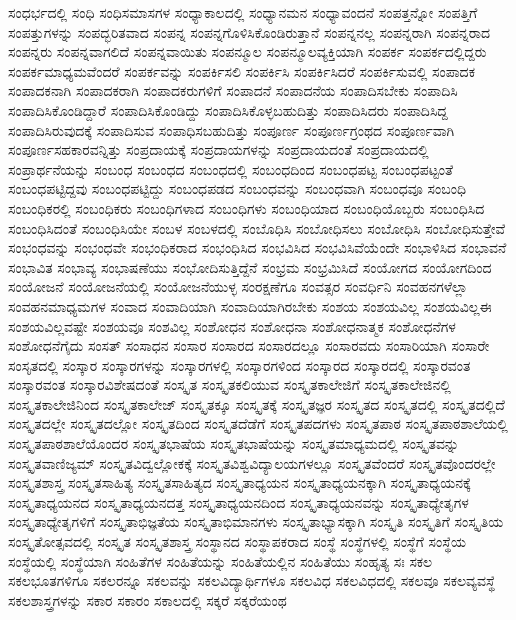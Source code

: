 {ಸಂಧರ್ಭದಲ್ಲಿ
ಸಂಧಿ
ಸಂಧಿಸಮಾಸಗಳ
ಸಂಧ್ಯಾಕಾಲದಲ್ಲಿ
ಸಂಧ್ಯಾನಮನ
ಸಂಧ್ಯಾವಂದನೆ
ಸಂಪತ್ತನ್ನೋ
ಸಂಪತ್ತಿಗೆ
ಸಂಪತ್ತುಗಳನ್ನು
ಸಂಪದ್ಭರಿತವಾದ
ಸಂಪನ್ನ
ಸಂಪನ್ನಗೊಳಿಸಿಕೊಂಡಿರುತ್ತಾನೆ
ಸಂಪನ್ನನಲ್ಲ
ಸಂಪನ್ನರಾಗಿ
ಸಂಪನ್ನರಾದ
ಸಂಪನ್ನರು
ಸಂಪನ್ನವಾಗಲಿದೆ
ಸಂಪನ್ನವಾಯಿತು
ಸಂಪನ್ಮೂಲ
ಸಂಪನ್ಮೂಲವ್ಯಕ್ತಿಯಾಗಿ
ಸಂಪರ್ಕ
ಸಂಪರ್ಕದಲ್ಲಿದ್ದರು
ಸಂಪರ್ಕಮಾಧ್ಯಮವೆಂದರೆ
ಸಂಪರ್ಕವನ್ನು
ಸಂಪರ್ಕಿಸಲಿ
ಸಂಪರ್ಕಿಸಿ
ಸಂಪರ್ಕಿಸಿದರೆ
ಸಂಪರ್ಕಿಸುವಲ್ಲಿ
ಸಂಪಾದಕ
ಸಂಪಾದಕನಾಗಿ
ಸಂಪಾದಕರಾಗಿ
ಸಂಪಾದಕರುಗಳಿಗೆ
ಸಂಪಾದನೆ
ಸಂಪಾದನೆಯ
ಸಂಪಾದಿಸಬೇಕು
ಸಂಪಾದಿಸಿ
ಸಂಪಾದಿಸಿಕೊಂಡಿದ್ದಾರೆ
ಸಂಪಾದಿಸಿಕೊಂಡಿದ್ದು
ಸಂಪಾದಿಸಿಕೊಳ್ಳಬಹುದಿತ್ತು
ಸಂಪಾದಿಸಿದರು
ಸಂಪಾದಿಸಿದ್ದ
ಸಂಪಾದಿಸಿರುವುದಕ್ಕೆ
ಸಂಪಾದಿಸುವ
ಸಂಪಾಧಿಸಬಹುದಿತ್ತು
ಸಂಪೂರ್ಣ
ಸಂಪೂರ್ಣಗ್ರಂಥದ
ಸಂಪೂರ್ಣವಾಗಿ
ಸಂಪೂರ್ಣಸಹಕಾರವನ್ನಿತ್ತು
ಸಂಪ್ರದಾಯಕ್ಕೆ
ಸಂಪ್ರದಾಯಗಳನ್ನು
ಸಂಪ್ರದಾಯದಂತೆ
ಸಂಪ್ರದಾಯದಲ್ಲಿ
ಸಂಪ್ರಾರ್ಥನೆಯನ್ನು
ಸಂಬಂಧ
ಸಂಬಂಧದ
ಸಂಬಂಧದಲ್ಲಿ
ಸಂಬಂಧದಿಂದ
ಸಂಬಂಧಪಟ್ಟ
ಸಂಬಂಧಪಟ್ಟಂತೆ
ಸಂಬಂಧಪಟ್ಟಿದ್ದವು
ಸಂಬಂಧಪಟ್ಟಿದ್ದು
ಸಂಬಂಧಪಡದ
ಸಂಬಂಧವನ್ನು
ಸಂಬಂಧವಾಗಿ
ಸಂಬಂಧವೂ
ಸಂಬಂಧಿ
ಸಂಬಂಧಿಕರಲ್ಲಿ
ಸಂಬಂಧಿಕರು
ಸಂಬಂಧಿಗಳಾದ
ಸಂಬಂಧಿಗಳು
ಸಂಬಂಧಿಯಾದ
ಸಂಬಂಧಿಯೊಬ್ಬರು
ಸಂಬಂಧಿಸಿದ
ಸಂಬಂಧಿಸಿದಂತೆ
ಸಂಬಂಧಿಸಿಯೇ
ಸಂಬಳ
ಸಂಬಳದಲ್ಲಿ
ಸಂಬೊಧಿಸಿ
ಸಂಬೋಧಿಸಲು
ಸಂಬೋಧಿಸಿ
ಸಂಬೋಧಿಸುತ್ತೇವೆ
ಸಂಭಂಧವನ್ನು
ಸಂಭಂಧವೇ
ಸಂಭಂಧಿಕರಾದ
ಸಂಭಂಧಿಸಿದ
ಸಂಭವಿಸಿದ
ಸಂಭವಿಸಿವೆಯೆಂದೇ
ಸಂಭಾಳಿಸಿದ
ಸಂಭಾವನೆ
ಸಂಭಾವಿತ
ಸಂಭಾವ್ಯ
ಸಂಭಾಷಣೆಯು
ಸಂಭೋದಿಸುತ್ತಿದ್ದೆನೆ
ಸಂಭ್ರಮ
ಸಂಭ್ರಮಿಸಿದೆ
ಸಂಯೋಗದ
ಸಂಯೋಗದಿಂದ
ಸಂಯೋಜನೆ
ಸಂಯೋಜನೆಯಲ್ಲಿ
ಸಂಯೋಜನೆಯುಳ್ಳ
ಸಂರಕ್ಷಣೆಗೂ
ಸಂವತ್ಸರ
ಸಂವರ್ಧಿನಿ
ಸಂವಹನಗಳೆಲ್ಲಾ
ಸಂವಹನಮಾಧ್ಯಮಗಳ
ಸಂವಾದ
ಸಂವಾದಿಯಾಗಿ
ಸಂವಾದಿಯಾಗಿರಬೇಕು
ಸಂಶಯ
ಸಂಶಯವಿಲ್ಲ
ಸಂಶಯವಿಲ್ಲಈ
ಸಂಶಯವಿಲ್ಲವಷ್ಟೇ
ಸಂಶಯವೂ
ಸಂಶವಿಲ್ಲ
ಸಂಶೋಧನ
ಸಂಶೋಧನಾ
ಸಂಶೋಧನಾತ್ಮಕ
ಸಂಶೋಧನೆಗಳ
ಸಂಶೋಧನೆಗೈದು
ಸಂಸತ್
ಸಂಸಾಧನ
ಸಂಸಾರ
ಸಂಸಾರದ
ಸಂಸಾರದಲ್ಲೂ
ಸಂಸಾರವದು
ಸಂಸಾರಿಯಾಗಿ
ಸಂಸಾರೇ
ಸಂಸೃತದಲ್ಲಿ
ಸಂಸ್ಕಾರ
ಸಂಸ್ಕಾರಗಳನ್ನು
ಸಂಸ್ಕಾರಗಳಲ್ಲಿ
ಸಂಸ್ಕಾರಗಳಿಂದ
ಸಂಸ್ಕಾರದ
ಸಂಸ್ಕಾರದಲ್ಲಿ
ಸಂಸ್ಕಾರವಂತ
ಸಂಸ್ಕಾರವಂತ
ಸಂಸ್ಕಾರವಿಶೇಷದಂತೆ
ಸಂಸ್ಕೃತ
ಸಂಸ್ಕೃತಕಲಿಯುವ
ಸಂಸ್ಕೃತಕಾಲೇಜಿಗೆ
ಸಂಸ್ಕೃತಕಾಲೇಜಿನಲ್ಲಿ
ಸಂಸ್ಕೃತಕಾಲೇಜಿನಿಂದ
ಸಂಸ್ಕೃತಕಾಲೇಜ್
ಸಂಸ್ಕೃತಕ್ಕೂ
ಸಂಸ್ಕೃತಕ್ಕೆ
ಸಂಸ್ಕೃತಜ್ಞರ
ಸಂಸ್ಕೃತದ
ಸಂಸ್ಕೃತದಲ್ಲಿ
ಸಂಸ್ಕೃತದಲ್ಲಿದೆ
ಸಂಸ್ಕೃತದಲ್ಲೇ
ಸಂಸ್ಕೃತದಲ್ಲೋ
ಸಂಸ್ಕೃತದಿಂದ
ಸಂಸ್ಕೃತದೆಡೆಗೆ
ಸಂಸ್ಕೃತಪದಗಳು
ಸಂಸ್ಕೃತಪಾಠ
ಸಂಸ್ಕೃತಪಾಠಶಾಲೆಯಲ್ಲಿ
ಸಂಸ್ಕೃತಪಾಠಶಾಲೆಯೊಂದರ
ಸಂಸ್ಕೃತಭಾಷೆಯ
ಸಂಸ್ಕೃತಭಾಷೆಯನ್ನು
ಸಂಸ್ಕೃತಮಾಧ್ಯಮದಲ್ಲಿ
ಸಂಸ್ಕೃತವನ್ನು
ಸಂಸ್ಕೃತವಾಣಿಜ್ಯಮ್
ಸಂಸ್ಕೃತವಿದ್ವಲ್ಲೋಕಕ್ಕೆ
ಸಂಸ್ಕೃತವಿಶ್ವವಿದ್ಯಾಲಯಗಳಲ್ಲೂ
ಸಂಸ್ಕೃತವೆಂದರೆ
ಸಂಸ್ಕೃತವೊಂದರಲ್ಲೇ
ಸಂಸ್ಕೃತಶಾಸ್ತ್ರ
ಸಂಸ್ಕೃತಸಾಹಿತ್ಯ
ಸಂಸ್ಕೃತಸಾಹಿತ್ಯದ
ಸಂಸ್ಕೃತಾಧ್ಯಯನ
ಸಂಸ್ಕೃತಾಧ್ಯಯನಕ್ಕಾಗಿ
ಸಂಸ್ಕೃತಾಧ್ಯಯನಕ್ಕೆ
ಸಂಸ್ಕೃತಾಧ್ಯಯನದ
ಸಂಸ್ಕೃತಾಧ್ಯಯನದತ್ತ
ಸಂಸ್ಕೃತಾಧ್ಯಯನದಿಂದ
ಸಂಸ್ಕೃತಾಧ್ಯಯನವನ್ನು
ಸಂಸ್ಕೃತಾಧ್ಯೇತೃಗಳ
ಸಂಸ್ಕೃತಾಧ್ಯೇತೃಗಳಿಗೆ
ಸಂಸ್ಕೃತಾಭಿಜ್ಞತೆಯ
ಸಂಸ್ಕೃತಾಭಿಮಾನಗಳು
ಸಂಸ್ಕೃತಾಭ್ಯಾಸಕ್ಕಾಗಿ
ಸಂಸ್ಕೃತಿ
ಸಂಸ್ಕೃತಿಗೆ
ಸಂಸ್ಕೃತಿಯ
ಸಂಸ್ಕೃತೋತ್ಸವದಲ್ಲಿ
ಸಂಸ್ಕೃತ
ಸಂಸ್ಕೃತಶಾಸ್ತ್ರ
ಸಂಸ್ಥಾನದ
ಸಂಸ್ಥಾಪಕರಾದ
ಸಂಸ್ಥೆ
ಸಂಸ್ಥೆಗಳಲ್ಲಿ
ಸಂಸ್ಥೆಗೆ
ಸಂಸ್ಥೆಯ
ಸಂಸ್ಥೆಯಲ್ಲಿ
ಸಂಸ್ಥೆಯಾಗಿ
ಸಂಹಿತೆಗಳ
ಸಂಹಿತೆಯನ್ನು
ಸಂಹಿತೆಯಲ್ಲಿನ
ಸಂಹಿತೆಯು
ಸಂಹೃತ್ಯ
ಸಃ
ಸಕಲ
ಸಕಲಭೂತಗಳಿಗೂ
ಸಕಲರನ್ನೂ
ಸಕಲವನ್ನು
ಸಕಲವಿದ್ಯಾರ್ಥಿಗಳೂ
ಸಕಲವಿಧ
ಸಕಲವಿಧದಲ್ಲಿ
ಸಕಲವೂ
ಸಕಲವ್ಯವಸ್ಥೆ
ಸಕಲಶಾಸ್ತ್ರಗಳನ್ನು
ಸಕಾರ
ಸಕಾರಂ
ಸಕಾಲದಲ್ಲಿ
ಸಕ್ಕರೆ
ಸಕ್ಕರೆಯಂಥ
}
